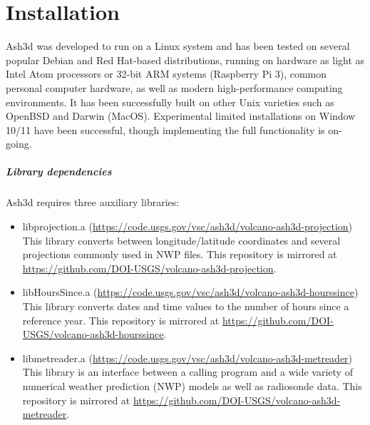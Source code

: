 \chapter{Installation}\label{ChapInstall}
Ash3d was developed to run on a Linux system and has been tested on several
popular Debian and Red Hat-based distributions, running on hardware as light
as Intel Atom processors or 32-bit ARM systems (Raspberry Pi 3), common
personal computer hardware, as well as modern high-performance computing
environments.
It has been successfully built on other Unix varieties such as OpenBSD
and Darwin (MacOS).  Experimental limited installations on Window 10/11 have been
successful, though implementing the full functionality is on-going.

\paragraph{Library dependencies}
Ash3d requires three auxiliary libraries:
\begin{itemize}
\item libprojection.a (\url{https://code.usgs.gov/vsc/ash3d/volcano-ash3d-projection}) \\
This library converts between longitude/latitude coordinates and several projections
commonly used in NWP files.
This repository is mirrored at \url{https://github.com/DOI-USGS/volcano-ash3d-projection}.

\item libHoursSince.a (\url{https://code.usgs.gov/vsc/ash3d/volcano-ash3d-hourssince}) \\
This library converts dates and time values to the number of hours since a
reference year.
This repository is mirrored at \url{https://github.com/DOI-USGS/volcano-ash3d-hourssince}.

\item libmetreader.a  (\url{https://code.usgs.gov/vsc/ash3d/volcano-ash3d-metreader}) \\
This library is an interface between a calling program and a wide variety of
numerical weather prediction (NWP) models as well as radiosonde data.
This repository is mirrored at \url{https://github.com/DOI-USGS/volcano-ash3d-metreader}.

\end{itemize}

